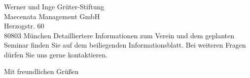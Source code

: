 \documentclass[../style/orpheus,fontsize=11pt]{scrlttr2}
\begin{document}
\begin{letter}{
\noindent Werner und Inge Gr\"uter-Stiftung \\
Maecenata Management GmbH \\
Herzogstr. 60\\
80803 M\"unchen
}
Detailliertere Informationen zum Verein und dem geplanten Seminar finden Sie auf dem beiliegenden Informationsblatt.  Bei weiteren Fragen  d\"urfen Sie uns gerne kontaktieren.




\closing{Mit freundlichen Gr\"u\ss en}


\end{letter}
\end{document}
